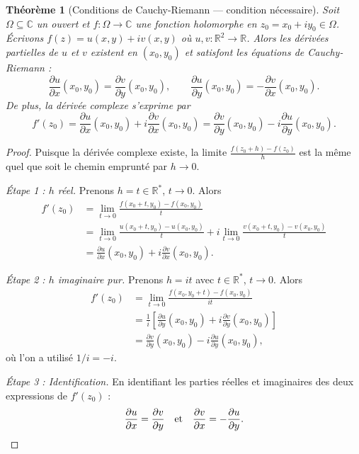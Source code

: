 \documentclass[12pt,a4paper,openany]{book}
\theoremstyle{definition}
\theoremstyle{plain}
\newtheorem{theoreme}[definition]{Théorème}
\theoremstyle{remark}
\newcommand{\C}{\mathbb{C}}
\newcommand{\R}{\mathbb{R}}
\begin{document}
\begin{theoreme}[Conditions de Cauchy-Riemann --- condition nécessaire]\label{thm:cauchy-riemann}
Soit $\Omega \subseteq \C$ un ouvert et $f : \Omega \to \C$ une fonction holomorphe en $z_0 = x_0 + iy_0 \in \Omega$. Écrivons $f(z) = u(x,y) + iv(x,y)$ où $u, v : \R^2 \to \R$. Alors les dérivées partielles de $u$ et $v$ existent en $(x_0,y_0)$ et satisfont les \emph{équations de Cauchy-Riemann} :
\begin{equation}\label{eq:cauchy-riemann}
  \frac{\partial u}{\partial x}(x_0,y_0) = \frac{\partial v}{\partial y}(x_0,y_0), \qquad
  \frac{\partial u}{\partial y}(x_0,y_0) = -\frac{\partial v}{\partial x}(x_0,y_0).
\end{equation}
De plus, la dérivée complexe s'exprime par
\begin{equation}\label{eq:derivee-via-CR}
  f'(z_0) = \frac{\partial u}{\partial x}(x_0,y_0) + i\frac{\partial v}{\partial x}(x_0,y_0) = \frac{\partial v}{\partial y}(x_0,y_0) - i\frac{\partial u}{\partial y}(x_0,y_0).
\end{equation}
\end{theoreme}

\begin{proof}
Puisque la dérivée complexe existe, la limite $\frac{f(z_0+h)-f(z_0)}{h}$ est la même quel que soit le chemin emprunté par $h \to 0$.

\emph{Étape 1 : $h$ réel.} Prenons $h = t \in \R^*$, $t \to 0$. Alors
\begin{align*}
  f'(z_0) &= \lim_{t \to 0} \frac{f(x_0+t, y_0) - f(x_0,y_0)}{t} \\
  &= \lim_{t \to 0} \frac{u(x_0+t,y_0)-u(x_0,y_0)}{t} + i\lim_{t \to 0}\frac{v(x_0+t,y_0)-v(x_0,y_0)}{t} \\
  &= \frac{\partial u}{\partial x}(x_0,y_0) + i\frac{\partial v}{\partial x}(x_0,y_0).
\end{align*}

\emph{Étape 2 : $h$ imaginaire pur.} Prenons $h = it$ avec $t \in \R^*$, $t \to 0$. Alors
\begin{align*}
  f'(z_0) &= \lim_{t \to 0} \frac{f(x_0, y_0+t) - f(x_0,y_0)}{it} \\
  &= \frac{1}{i}\left[\frac{\partial u}{\partial y}(x_0,y_0) + i\frac{\partial v}{\partial y}(x_0,y_0)\right] \\
  &= \frac{\partial v}{\partial y}(x_0,y_0) - i\frac{\partial u}{\partial y}(x_0,y_0),
\end{align*}
où l'on a utilisé $1/i = -i$.

\emph{Étape 3 : Identification.} En identifiant les parties réelles et imaginaires des deux expressions de $f'(z_0)$ :
\[
  \frac{\partial u}{\partial x} = \frac{\partial v}{\partial y} \quad\text{et}\quad \frac{\partial v}{\partial x} = -\frac{\partial u}{\partial y}. \qedhere
\]
\end{proof}
\end{document}
